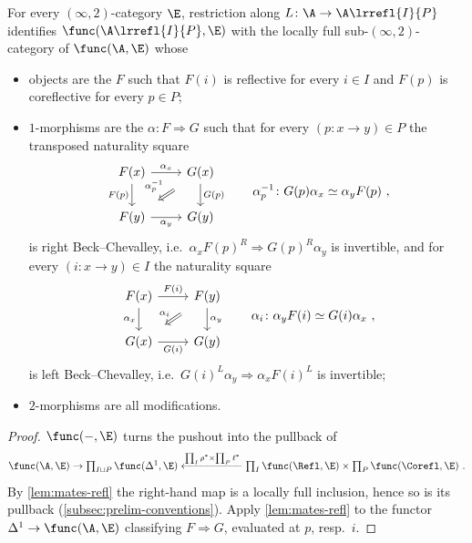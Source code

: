 \begin{prop}
\label{prop:adjoin-univ}
For every $(\infty,2)$-category $\E$, restriction along $L\colon \A \to \A\lrrefl{I}{P}$ identifies $\func(\A\lrrefl{I}{P},\E)$ with the locally full sub-$(\infty,2)$-category of $\func(\A,\E)$ whose
\begin{itemize}
\item objects are the $F$ such that $F(i)$ is reflective for every $i \in I$ and $F(p)$ is coreflective for every $p \in P$;
\item $1$-morphisms are the $\alpha\colon F \Rightarrow G$ such that for every $(p\colon x \to y) \in P$ the transposed naturality square
\[
\begin{tikzcd}
F(x) \ar[r, "\alpha_{x}"] \ar[d, "F(p)"'] & G(x) \ar[d, "G(p)"] \ar[dl, Rightarrow, shorten=3mm, "\alpha_{p}^{-1}"'] \\
F(y) \ar[r, "\alpha_{y}"'] & G(y)
\end{tikzcd}
\qquad \alpha_{p}^{-1}\colon G(p)\alpha_{x} \simeq \alpha_{y}F(p) \ ,
\]
is right Beck--Chevalley, i.e.\ $\alpha_{x}F(p)^{R} \Rightarrow G(p)^{R}\alpha_{y}$ is invertible, and for every $(i\colon x \to y) \in I$ the naturality square
\[
\begin{tikzcd}
F(x) \ar[r, "F(i)"] \ar[d, "\alpha_{x}"'] & F(y) \ar[d, "\alpha_{y}"] \ar[dl, Rightarrow, shorten=3mm, "\alpha_{i}"'] \\
G(x) \ar[r, "G(i)"'] & G(y)
\end{tikzcd}
\qquad \alpha_{i}\colon \alpha_{y}F(i) \simeq G(i)\alpha_{x} \ ,
\]
is left Beck--Chevalley, i.e.\ $G(i)^{L}\alpha_{y} \Rightarrow \alpha_{x}F(i)^{L}$ is invertible;
\item $2$-morphisms are all modifications.
\end{itemize}
\end{prop}

\begin{proof}
$\func(-,\E)$ turns the pushout into the pullback of
\[
\func(\A,\E) \to \textstyle\prod_{I \sqcup P}\func(\Delta^{1},\E) \xleftarrow{\prod_{I}\rho^{*} \times \prod_{P}\ell^{*}} \prod_{I}\func(\Refl,\E) \times \prod_{P}\func(\Corefl,\E) \ .
\]
By \cref{lem:mates-refl} the right-hand map is a locally full inclusion, hence so is its pullback (\cref{subsec:prelim-conventions}). Apply \cref{lem:mates-refl} to the functor $\Delta^{1} \to \func(\A,\E)$ classifying $F \Rightarrow G$, evaluated at $p$, resp.\ $i$.
\end{proof}

